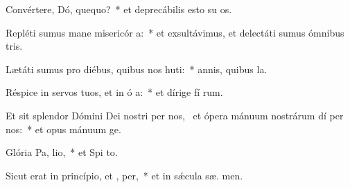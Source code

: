 \item Convértere, Dó, quequo?~* et deprecábilis esto su  os.
\item Repléti sumus mane misericór a:~* et exsultávimus, et delectáti sumus ómnibus  tris.
\item Lætáti sumus pro diébus, quibus nos huti:~* annis, quibus  la.
\item Réspice in servos tuos, et in ó a:~* et dírige fí rum.
\item Et sit splendor Dómini Dei nostri per nos,~\pscross{} et ópera mánuum nostrárum dí per nos:~* et opus mánuum  ge.
\item Glória Pa,  lio,~* et Spi to.
\item Sicut erat in princípio, et ,  per,~* et in sǽcula sæ. men.
